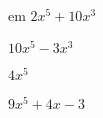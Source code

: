\documentclass{article}
\begin{document}
\begin{multicols}{2}
em $2x^{5}+10x^{3}$\item $10x^{5}-3x^{3}$\item $4x^{5}$\item $9x^{5}+4x-3$\
\end{multicols}
\end{document}
